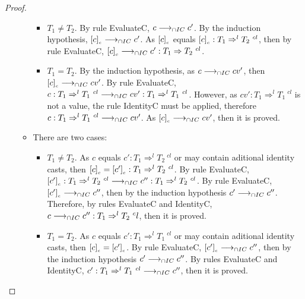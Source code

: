 \documentclass[a4paper]{article}
\begin{document}
\begin{proof}
\begin{itemize}
\begin{itemize}
        \begin{itemize}
            \item $T_1 \neq T_2$.
            By rule EvaluateC, $c \longrightarrow_{\cap IC} c'$.
            By the induction hypothesis, $[c]_{_c} \longrightarrow_{\cap IC} c'$.
            As $[c]_{_c}$ equals $\erasec{c} : T_1 \Rightarrow^l T_2\ ^{cl}$, then by rule EvaluateC, $\erasec{c} \icos c' : T_1 \Rightarrow T_2\ ^{cl}$.
            \item $T_1 = T_2$.
            By the induction hypothesis, as $c \longrightarrow_{\cap IC} cv'$, then $[c]_{_c} \longrightarrow_{\cap IC} cv'$.
            By rule EvaluateC, $c : T_1 \Rightarrow^l T_1\ ^{cl} \icos cv' : T_1 \Rightarrow^l T_1\ ^{cl}$.
            However, as $cv' : T_1 \Rightarrow^l T_1\ ^{cl}$ is not a value, the rule IdentityC must be applied, therefore $c : T_1 \Rightarrow^l T_1\ ^{cl} \longrightarrow_{\cap IC} cv'$.
            As $[c]_{_c} \longrightarrow_{\cap IC} cv'$, then it is proved.
        \end{itemize}
        \item There are two cases:
        \begin{itemize}
            \item $T_1 \neq T_2$. As $c$ equals $c' : T_1 \Rightarrow^l T_2\ ^{cl}$ or may contain aditional identity casts, then $\erasec{c} = \erasec{c'} : T_1 \Rightarrow^l T_2\ ^{cl}$.
            By rule EvaluateC, $\erasec{c'} : T_1 \Rightarrow^l T_2\ ^{cl} \icos c'' : T_1 \Rightarrow^l T_2\ ^{cl}$.
            By rule EvaluateC, $[c']_{_c} \longrightarrow_{\cap IC} c''$, then by the induction hypothesis $c' \longrightarrow_{\cap IC} c''$.
            Therefore, by rules EvaluateC and IdentityC, $c \longrightarrow_{\cap IC} c'' : T_1 \Rightarrow^l T_2\ ^cl$, then it is proved.
            \item $T_1 = T_2$. As $c$ equals $c' : T_1 \Rightarrow^l T_1\ ^{cl}$ or may contain aditional identity casts, then $[c]_{_c} = [c']_{_c}$.
            By rule EvaluateC, $[c']_{_c} \longrightarrow_{\cap IC} c''$, then by the induction hypothesis $c' \longrightarrow_{\cap IC} c''$.
            By rules EvaluateC and IdentityC, $c' : T_1 \Rightarrow^l T_1\ ^{cl} \longrightarrow_{\cap IC} c''$, then it is proved.
        \end{itemize}
    \end{itemize}
\end{itemize}
\end{proof}
\end{document}
